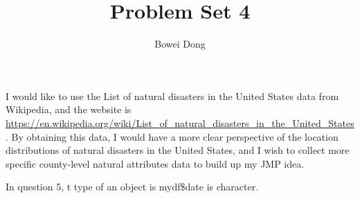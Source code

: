 \documentclass{article}
\title{Problem Set 4}
\author{Bowei Dong}
\date{}
\begin{document}
\maketitle

I would like to use the List of natural disasters in the United States data from Wikipedia, and the website is \url{https://en.wikipedia.org/wiki/List_of_natural_disasters_in_the_United_States}. By obtaining this data, I would have a more clear perspective of the location distributions of natural disasters in the United States, and I wish to collect more specific county-level natural attributes data to build up my JMP idea.

In question 5, t type of an object is mydf\$date is character. 
\end{document}

